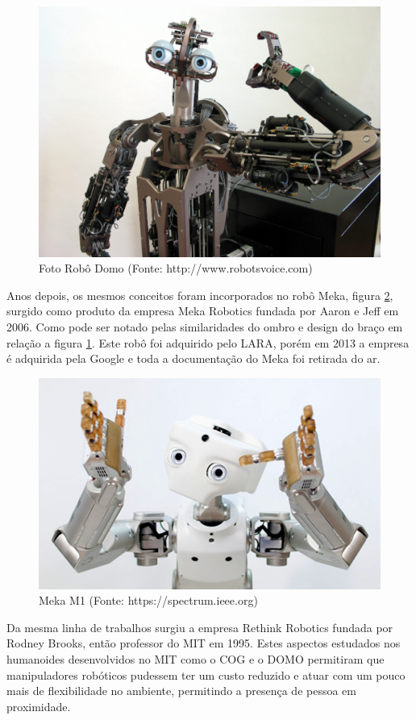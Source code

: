 \begin{figure}[H]
    \centering
    \includegraphics[width=0.6\linewidth]{tex/figs/domo-foto.jpg}
    \caption{Foto Robô Domo (Fonte: http://www.robotsvoice.com)}
    \label{fig:domorobot}
\end{figure}

Anos depois, os mesmos conceitos foram incorporados no robô Meka, figura \ref{fig:meka}, surgido como produto da empresa Meka Robotics fundada por Aaron e Jeff em 2006. Como pode ser notado pelas similaridades do ombro e design do braço em relação a figura \ref{fig:domorobot}. Este robô foi adquirido pelo LARA, porém em 2013 a empresa é adquirida pela Google e toda a documentação do Meka foi retirada do ar. 


\begin{figure}[H]
    \centering
    \includegraphics[width=0.6\linewidth]{tex/figs/meka-robot.png}
    \caption{Meka M1 (Fonte: https://spectrum.ieee.org)}
    \label{fig:meka}
\end{figure}

Da mesma linha de trabalhos surgiu a empresa Rethink Robotics fundada por Rodney Brooks, então professor do MIT em 1995. Estes aspectos estudados nos humanoides desenvolvidos no MIT como o COG e o DOMO permitiram que manipuladores robóticos pudessem ter um custo reduzido e atuar com um pouco mais de flexibilidade no ambiente, permitindo a presença de pessoa em proximidade.

